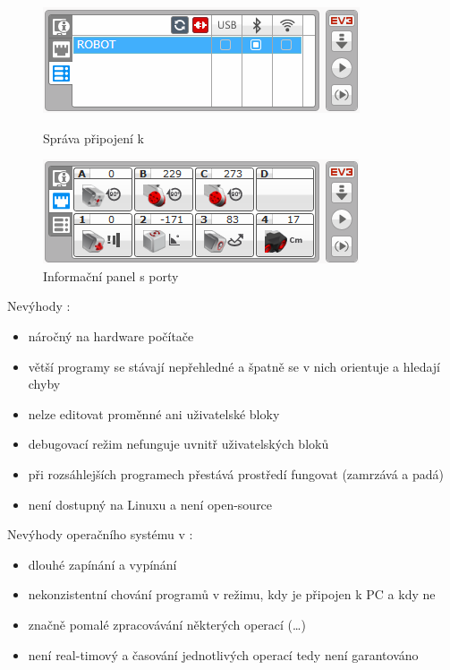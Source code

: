 \begin{figure}[h]
	\begin{minipage}[b]{.45\textwidth}
		\centering
		\includegraphics[width=\textwidth]{images/lego-soft/lego-soft_brick-manager_connected.png}
		\caption{Správa připojení k }
		\label{fig:lego-soft_brick-manager-connected}
	\end{minipage}
	\hfill
	\begin{minipage}[b]{.45\textwidth}
		\centering
		\includegraphics[width=\textwidth]{images/lego-soft/lego-soft_brick_port-view.png}
		\caption{Informační panel s porty}
		\label{fig:lego-soft_brick_port-view}
	\end{minipage}
\end{figure}

Nevýhody \legoSW:
\renewcommand{\labelitemi}{$-$}
\begin{itemize}[noitemsep]\itemsep2pt
	\item náročný na hardware počítače
	\item větší programy se stávají nepřehledné a špatně se v nich orientuje a hledají chyby
	\item nelze editovat proměnné ani uživatelské bloky
	\item debugovací režim nefunguje uvnitř uživatelských bloků
	\item při rozsáhlejších programech přestává prostředí fungovat (zamrzává a padá)
	\item není dostupný na Linuxu a není open-source
\end{itemize}

Nevýhody operačního systému v :  %
\begin{itemize}[noitemsep]\itemsep2pt
	\item dlouhé zapínání a vypínání 
	\item nekonzistentní chování programů v režimu, kdy je \brick{} připojen k PC a kdy ne
	\item značně pomalé zpracovávání některých operací (\dots)
	\item není real-timový a časování jednotlivých operací tedy není garantováno
\end{itemize}

